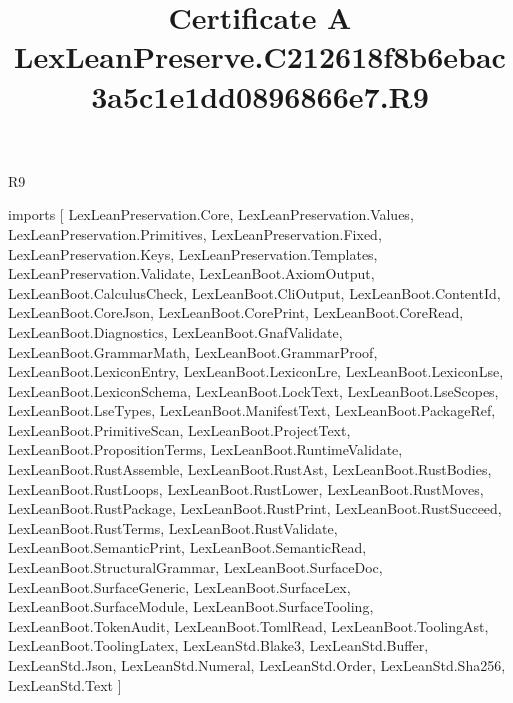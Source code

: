 \begin{lexlean}{R9}
\title{Certificate A LexLeanPreserve.C212618f8b6ebac3a5c1e1dd0896866e7.R9}
\begin{coremodule}
imports [
  LexLeanPreservation.Core,
  LexLeanPreservation.Values,
  LexLeanPreservation.Primitives,
  LexLeanPreservation.Fixed,
  LexLeanPreservation.Keys,
  LexLeanPreservation.Templates,
  LexLeanPreservation.Validate,
  LexLeanBoot.AxiomOutput,
  LexLeanBoot.CalculusCheck,
  LexLeanBoot.CliOutput,
  LexLeanBoot.ContentId,
  LexLeanBoot.CoreJson,
  LexLeanBoot.CorePrint,
  LexLeanBoot.CoreRead,
  LexLeanBoot.Diagnostics,
  LexLeanBoot.GnafValidate,
  LexLeanBoot.GrammarMath,
  LexLeanBoot.GrammarProof,
  LexLeanBoot.LexiconEntry,
  LexLeanBoot.LexiconLre,
  LexLeanBoot.LexiconLse,
  LexLeanBoot.LexiconSchema,
  LexLeanBoot.LockText,
  LexLeanBoot.LseScopes,
  LexLeanBoot.LseTypes,
  LexLeanBoot.ManifestText,
  LexLeanBoot.PackageRef,
  LexLeanBoot.PrimitiveScan,
  LexLeanBoot.ProjectText,
  LexLeanBoot.PropositionTerms,
  LexLeanBoot.RuntimeValidate,
  LexLeanBoot.RustAssemble,
  LexLeanBoot.RustAst,
  LexLeanBoot.RustBodies,
  LexLeanBoot.RustLoops,
  LexLeanBoot.RustLower,
  LexLeanBoot.RustMoves,
  LexLeanBoot.RustPackage,
  LexLeanBoot.RustPrint,
  LexLeanBoot.RustSucceed,
  LexLeanBoot.RustTerms,
  LexLeanBoot.RustValidate,
  LexLeanBoot.SemanticPrint,
  LexLeanBoot.SemanticRead,
  LexLeanBoot.StructuralGrammar,
  LexLeanBoot.SurfaceDoc,
  LexLeanBoot.SurfaceGeneric,
  LexLeanBoot.SurfaceLex,
  LexLeanBoot.SurfaceModule,
  LexLeanBoot.SurfaceTooling,
  LexLeanBoot.TokenAudit,
  LexLeanBoot.TomlRead,
  LexLeanBoot.ToolingAst,
  LexLeanBoot.ToolingLatex,
  LexLeanStd.Blake3,
  LexLeanStd.Buffer,
  LexLeanStd.Json,
  LexLeanStd.Numeral,
  LexLeanStd.Order,
  LexLeanStd.Sha256,
  LexLeanStd.Text
]


\end{coremodule}
\end{lexlean}

